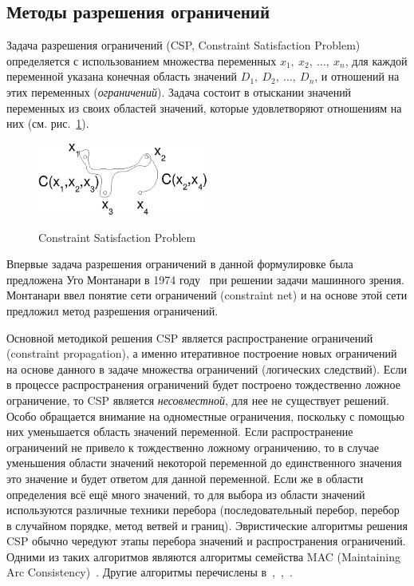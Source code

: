 \subsection{Методы разрешения ограничений}

Задача разрешения ограничений (CSP, Constraint Satisfaction
Problem)~\cite{CSP} определяется с использованием множества
переменных $x_1,~x_2,~\dots,~x_n$, для каждой переменной указана
конечная область значений $D_1,~D_2,~\dots,~D_n$, и отношений на
этих переменных (\emph{ограничений}). Задача состоит в отыскании
значений переменных из своих областей значений, которые
удовлетворяют отношениям на них (см. рис.~\ref{csp}).

\begin{figure}[h] \center
  \includegraphics[width=0.5\textwidth]{2.theor/csp}\\
  \caption{Constraint Satisfaction Problem}\label{csp}
\end{figure}

Впервые задача разрешения ограничений в данной формулировке была
предложена Уго Монтанари в 1974 году~\cite{montanari} при решении
задачи машинного зрения. Монтанари ввел понятие сети ограничений
(constraint net) и на основе этой сети предложил метод разрешения
ограничений.

Основной методикой решения CSP является распространение ограничений
(constraint propagation), а именно итеративное построение новых
ограничений на основе данного в задаче множества ограничений
(логических следствий). Если в процессе распространения ограничений
будет построено тождественно ложное ограничение, то CSP является
\emph{несовместной}, для нее не существует решений. Особо обращается
внимание на одноместные ограничения, поскольку с помощью них
уменьшается область значений переменной. Если распространение
ограничений не привело к тождественно ложному ограничению, то в
случае уменьшения области значений некоторой переменной до
единственного значения это значение и будет ответом для данной
переменной. Если же в области определения всё ещё много значений, то
для выбора из области значений используются различные техники
перебора (последовательный перебор, перебор в случайном порядке,
метод ветвей и границ). Эвристические алгоритмы решения CSP обычно
чередуют этапы перебора значений и распространения ограничений.
Одними из таких алгоритмов являются алгоритмы семейства MAC
(Maintaining Arc Consistency)~\cite{CSP}. Другие алгоритмы
перечислены в~\cite{CSPS1},~\cite{CSPS2},~\cite{CSPS3}.

